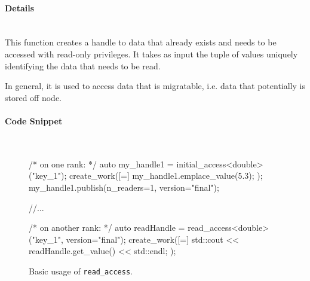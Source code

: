 \paragraph{Details}\mbox{}\\
This function creates a handle to data that already exists and 
needs to be accessed with read-only privileges. 
It takes as input the tuple of values uniquely 
identifying the data that needs to be read.  

In general, it is used to access data that is migratable, i.e. data 
that potentially is stored off node.


\paragraph{Code Snippet}\mbox{}\\
\begin{figure}[!h]
\begin{CppCodeNumb}
/* on one rank: */
auto my_handle1 = initial_access<double>("key_1");
create_work([=]{
  my_handle1.emplace_value(5.3);
});
my_handle1.publish(n_readers=1, version="final");

//...

/* on another rank: */
auto readHandle = read_access<double>("key_1", version="final");
create_work([=]{
  std::cout << readHandle.get_value() << std::endl;
});
\end{CppCodeNumb}
\label{fig:fe_api_readaccess}
\caption{Basic usage of \texttt{read\_access}.}
\end{figure}



